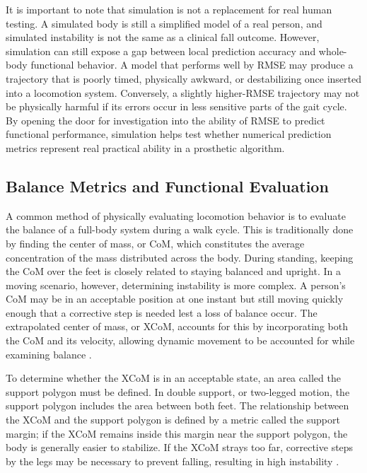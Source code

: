 \documentclass[referee,lineno,pdflatex,sn-vancouver-num]{sn-jnl}
\begin{document}
It is important to note that simulation is not a replacement for real human testing. A simulated body is still a simplified model of a real person, and simulated instability is not the same as a clinical fall outcome. However, simulation can still expose a gap between local prediction accuracy and whole-body functional behavior. A model that performs well by RMSE may produce a trajectory that is poorly timed, physically awkward, or destabilizing once inserted into a locomotion system. Conversely, a slightly higher-RMSE trajectory may not be physically harmful if its errors occur in less sensitive parts of the gait cycle. By opening the door for investigation into the ability of RMSE to predict functional performance, simulation helps test whether numerical prediction metrics represent real practical ability in a prosthetic algorithm.

\subsection{Balance Metrics and Functional Evaluation}

A common method of physically evaluating locomotion behavior is to evaluate the balance of a full-body system during a walk cycle. This is traditionally done by finding the center of mass, or CoM, which constitutes the average concentration of the mass distributed across the body. During standing, keeping the CoM over the feet is closely related to staying balanced and upright. In a moving scenario, however, determining instability is more complex. A person's CoM may be in an acceptable position at one instant but still moving quickly enough that a corrective step is needed lest a loss of balance occur. The extrapolated center of mass, or XCoM, accounts for this by incorporating both the CoM and its velocity, allowing dynamic movement to be accounted for while examining balance \cite{hof2005,hof2008}.

To determine whether the XCoM is in an acceptable state, an area called the support polygon must be defined. In double support, or two-legged motion, the support polygon includes the area between both feet. The relationship between the XCoM and the support polygon is defined by a metric called the support margin; if the XCoM remains inside this margin near the support polygon, the body is generally easier to stabilize. If the XCoM strays too far, corrective steps by the legs may be necessary to prevent falling, resulting in high instability \cite{hof2005,hof2008}.
\end{document}
